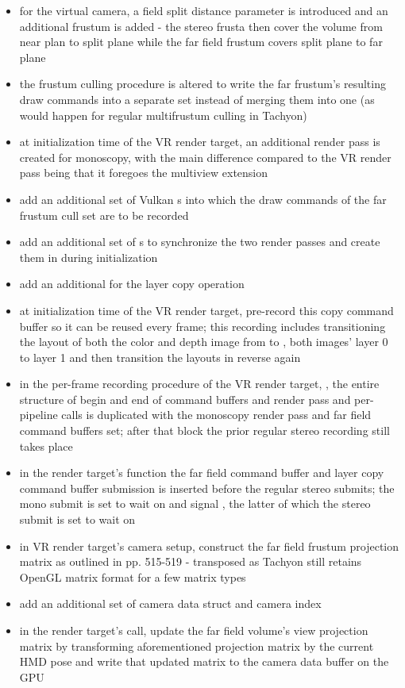 \begin{itemize}
\item for the virtual camera, a field split distance parameter is introduced and an additional frustum is added - the stereo frusta then cover the volume from near plan to split plane while the far field frustum covers split plane to far plane
\item the frustum culling procedure is altered to write the far frustum's resulting draw commands into a separate set instead of merging them into one (as would happen for regular multifrustum culling in Tachyon)
\item at initialization time of the VR render target, an additional render pass is created for monoscopy, with the main difference compared to the VR render pass being that it foregoes the multiview extension
\item add an additional set of Vulkan s into which the draw commands of the far frustum cull set are to be recorded
\item add an additional set of s to synchronize the two render passes and create them in  during initialization
\item add an additional  for the layer copy operation
\item at initialization time of the VR render target, pre-record this copy command buffer so it can be reused every frame; this recording includes transitioning the layout of both the color and depth image from  to ,  both images' layer 0 to layer 1 and then transition the layouts in reverse again
\item in the per-frame recording procedure of the VR render target, , the entire structure of begin and end of command buffers and render pass and per-pipeline  calls is duplicated with the monoscopy render pass and far field command buffers set; after that block the prior regular stereo recording still takes place
\item in the render target's  function the far field command buffer and layer copy command buffer submission is inserted before the regular stereo submits; the mono submit is set to wait on  and signal , the latter of which the stereo submit is set to wait on
\item in VR render target's camera setup, construct the far field frustum projection matrix as outlined in \cite{Lapinski.2017} pp. 515-519 - transposed as Tachyon still retains OpenGL matrix format for a few matrix types
\item add an additional set of camera data struct and camera index
\item in the render target's  call, update the far field volume's view projection matrix by transforming aforementioned projection matrix by the current HMD pose and write that updated matrix to the camera data buffer on the GPU
\end{itemize}
